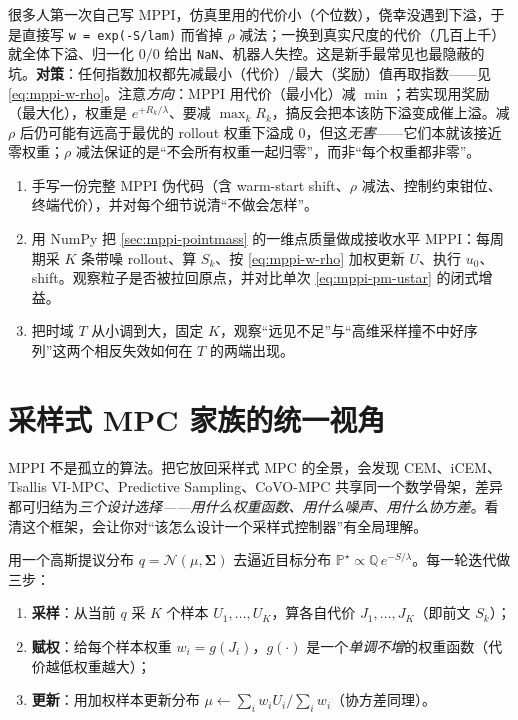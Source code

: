 \begin{pitfall}
很多人第一次自己写 MPPI，仿真里用的代价小（个位数），侥幸没遇到下溢，于是直接写 \texttt{w = exp(-S/lam)} 而省掉 $\rho$ 减法；一换到真实尺度的代价（几百上千）就全体下溢、归一化 $0/0$ 给出 \texttt{NaN}、机器人失控。这是新手最常见也最隐蔽的坑。\textbf{对策}：任何指数加权都先减最小（代价）/最大（奖励）值再取指数——见 \cref{eq:mppi-w-rho}。注意\emph{方向}：MPPI 用代价（最小化）减 $\min$；若实现用奖励（最大化），权重是 $e^{+R_k/\lambda}$、要减 $\max_k R_k$，搞反会把本该防下溢变成催上溢。减 $\rho$ 后仍可能有远高于最优的 rollout 权重下溢成 $0$，但这\emph{无害}——它们本就该接近零权重；$\rho$ 减法保证的是“不会所有权重一起归零”，而非“每个权重都非零”。
\end{pitfall}

\begin{practice}
\begin{enumerate}
  \item 手写一份完整 MPPI 伪代码（含 warm-start shift、$\rho$ 减法、控制约束钳位、终端代价），并对每个细节说清“不做会怎样”。
  \item 用 NumPy 把 \cref{sec:mppi-pointmass} 的一维点质量做成接收水平 MPPI：每周期采 $K$ 条带噪 rollout、算 $S_k$、按 \cref{eq:mppi-w-rho} 加权更新 $U$、执行 $u_0$、shift。观察粒子是否被拉回原点，并对比单次 \cref{eq:mppi-pm-ustar} 的闭式增益。
  \item 把时域 $T$ 从小调到大，固定 $K$，观察“远见不足”与“高维采样撞不中好序列”这两个相反失效如何在 $T$ 的两端出现。
\end{enumerate}
\end{practice}

\section{采样式 MPC 家族的统一视角}
\label{sec:mppi-family}

MPPI 不是孤立的算法。把它放回采样式 MPC 的全景，会发现 CEM、iCEM、Tsallis VI-MPC、Predictive Sampling、CoVO-MPC 共享同一个数学骨架，差异都可归结为\emph{三个设计选择——用什么权重函数、用什么噪声、用什么协方差}。看清这个框架，会让你对“该怎么设计一个采样式控制器”有全局理解。

\begin{definition}\label{def:mppi-skeleton}
用一个高斯提议分布 $q=\mathcal{N}(\mu,\boldsymbol{\Sigma})$ 去逼近目标分布 $\mathbb{P}^\star\propto\mathbb{Q}\,e^{-S/\lambda}$。每一轮迭代做三步：
\begin{enumerate}
  \item \textbf{采样}：从当前 $q$ 采 $K$ 个样本 $U_1,\dots,U_K$，算各自代价 $J_1,\dots,J_K$（即前文 $S_k$）；
  \item \textbf{赋权}：给每个样本权重 $w_i=g(J_i)$，$g(\cdot)$ 是一个\emph{单调不增}的权重函数（代价越低权重越大）；
  \item \textbf{更新}：用加权样本更新分布 $\mu\leftarrow\sum_i w_i U_i/\sum_i w_i$（协方差同理）。
\end{enumerate}
\end{definition}

